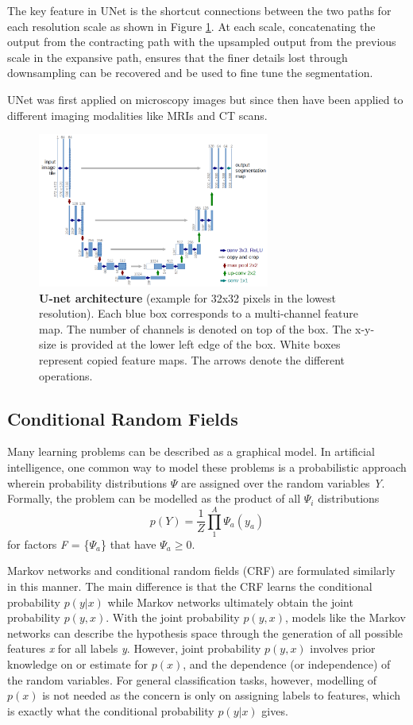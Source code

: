 \documentclass[journal]{IEEEtran}
\begin{document}
The key feature in UNet is the shortcut connections between the two paths for each resolution scale as shown in Figure \ref{fig:unet}. At each scale, concatenating the output from the contracting path with the upsampled output from the previous scale in the expansive path, ensures that the finer details lost through downsampling can be recovered and be used to fine tune the segmentation.

UNet was first applied on microscopy images but since then have been applied to different imaging modalities like MRIs and CT scans.
\begin{figure}
\centering
\includegraphics[width=3in]{unet.png}
\caption{\textbf{U-net architecture} \cite{RFB15a} (example for 32x32 pixels in the lowest resolution). Each blue
box corresponds to a multi-channel feature map. The number of channels is denoted
on top of the box. The x-y-size is provided at the lower left edge of the box. White
boxes represent copied feature maps. The arrows denote the different operations.}
\label{fig:unet}
\end{figure}
\subsection{Conditional Random Fields}
Many learning problems can be described as a graphical model. In artificial intelligence, one common way to model these problems is a probabilistic approach wherein probability distributions \textit{$\Psi$} are assigned over the random variables \textit{Y}. Formally, the problem can be modelled as the product of all \textit{$\Psi_i$} distributions
\begin{equation}
p(Y) = \frac{1}{Z}\prod_1^A \Psi_a(y_a)
\end{equation}
for factors \textit{F} = \{$\Psi_a$\} that have $\Psi_a \geq 0$. 
 
Markov networks and conditional random fields (CRF) are formulated similarly in this manner. The main difference is that the CRF learns the conditional probability $p(y|x)$ while Markov networks ultimately obtain the joint probability $p(y,x)$. With the joint probability $p(y,x)$, models like the Markov networks can describe the hypothesis space through the generation of all possible features \textit{x} for all labels \textit{y}. However, joint probability $p(y,x)$ involves prior knowledge on or estimate for $p(x)$, and the dependence (or independence) of the random variables. For general classification tasks, however, modelling of $p(x)$ is not needed as the concern is only on assigning labels to features, which is exactly what the conditional probability $p(y|x)$ gives.
\end{document}
